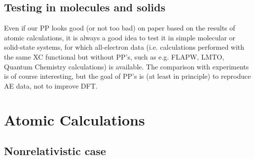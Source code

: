 \documentclass[12pt,a4paper]{article}
\begin{document}
\subsection{Testing in molecules and solids}

Even if our PP looks good
(or not too bad) on paper based on the results of atomic calculations,
it is always a good idea to test it in simple molecular or solid-state
systems, for which all-electron data (i.e. calculations performed with
the same XC functional but without PP's, such as e.g. FLAPW, LMTO,
Quantum Chemistry calculations) is available. The comparison with
experiments is of course interesting, but the goal of PP's is (at least in principle) to 
reproduce AE data, not to improve DFT.


\appendix

\section{Atomic Calculations}

\subsection{Nonrelativistic case}
\end{document}
